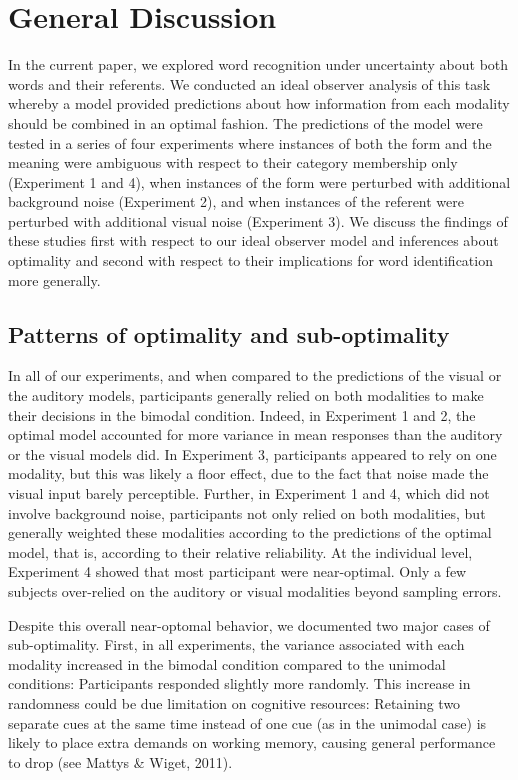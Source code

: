 \documentclass[english,,man,floatsintext]{apa6}
\theoremstyle{definition}
\theoremstyle{definition}
\theoremstyle{definition}
\theoremstyle{remark}
\begin{document}
\section{General Discussion}\label{general-discussion}

In the current paper, we explored word recognition under uncertainty
about both words and their referents. We conducted an ideal observer
analysis of this task whereby a model provided predictions about how
information from each modality should be combined in an optimal fashion.
The predictions of the model were tested in a series of four experiments
where instances of both the form and the meaning were ambiguous with
respect to their category membership only (Experiment 1 and 4), when
instances of the form were perturbed with additional background noise
(Experiment 2), and when instances of the referent were perturbed with
additional visual noise (Experiment 3). We discuss the findings of these
studies first with respect to our ideal observer model and inferences
about optimality and second with respect to their implications for word
identification more generally.

\subsection{Patterns of optimality and
sub-optimality}\label{patterns-of-optimality-and-sub-optimality}

In all of our experiments, and when compared to the predictions of the
visual or the auditory models, participants generally relied on both
modalities to make their decisions in the bimodal condition. Indeed, in
Experiment 1 and 2, the optimal model accounted for more variance in
mean responses than the auditory or the visual models did. In Experiment
3, participants appeared to rely on one modality, but this was likely a
floor effect, due to the fact that noise made the visual input barely
perceptible. Further, in Experiment 1 and 4, which did not involve
background noise, participants not only relied on both modalities, but
generally weighted these modalities according to the predictions of the
optimal model, that is, according to their relative reliability. At the
individual level, Experiment 4 showed that most participant were
near-optimal. Only a few subjects over-relied on the auditory or visual
modalities beyond sampling errors.

Despite this overall near-optomal behavior, we documented two major
cases of sub-optimality. First, in all experiments, the variance
associated with each modality increased in the bimodal condition
compared to the unimodal conditions: Participants responded slightly
more randomly. This increase in randomness could be due limitation on
cognitive resources: Retaining two separate cues at the same time
instead of one cue (as in the unimodal case) is likely to place extra
demands on working memory, causing general performance to drop (see
Mattys \& Wiget, 2011).
\end{document}
